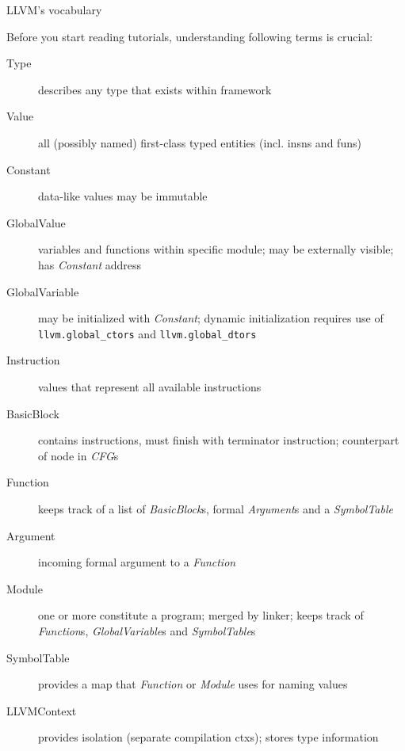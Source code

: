 \documentclass[8pt]{beamer}
\begin{document}
\begin{frame}{LLVM's vocabulary}
  \begin{block}{Before you start reading tutorials, understanding following
      terms is crucial:}
    \begin{description}
      \item[Type] describes any type that exists within framework
      \item[Value] all (possibly named) first-class typed entities (incl.
        insns and funs)
      \item[Constant] data-like values may be immutable 
      \item[GlobalValue] variables and functions within specific module;
        may be externally visible; has \emph{Constant} address
      \item[GlobalVariable] may be initialized with \emph{Constant}; dynamic
        initialization requires use of \texttt{llvm.global\_ctors} and
        \texttt{llvm.global\_dtors}
      \item[Instruction] values that represent all available instructions
      \item[BasicBlock] contains instructions, must finish with terminator
        instruction; counterpart of node in \emph{CFG}s
      \item[Function] keeps track of a list of \emph{BasicBlock}s, formal
        \emph{Argument}s and a \emph{SymbolTable}
      \item[Argument] incoming formal argument to a \emph{Function}
      \item[Module] one or more constitute a program; merged by linker; keeps
        track of \emph{Function}s, \emph{GlobalVariable}s and \emph{SymbolTable}s
      \item[SymbolTable] provides a map that \emph{Function} or \emph{Module}
        uses for naming values
      \item[LLVMContext] provides isolation (separate compilation ctxs); stores
        type information
    \end{description}
  \end{block}
\end{frame}
\end{document}
